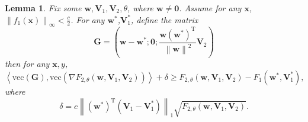 \documentclass{article}
\theoremstyle{plain}
\newtheorem{lem}{Lemma}
\theoremstyle{definition}
\newcommand{\norm}[1]{\left\lVert#1\right\rVert}
\newcommand{\iprod}[2]{\left\langle #1,#2 \right\rangle}
\begin{document}
\begin{lem}
	Fix some $\mathbf{w},\mathbf{V}_1,\mathbf{V}_2,\theta$,
    where $\mathbf{w}\neq\mathbf{0}$.
    Assume for any $\mathbf{x}$, $\norm{f_1(\mathbf{x})}_\infty<\frac c 2$.
    For any $\mathbf{w}^*$,$\mathbf{V}_1^*$, define the matrix
    \[\mathbf{G}=
    \left(\mathbf{w}-\mathbf{w}^*;
    \mathbf{0};
    \frac{\mathbf{w}\left(\mathbf{w}^{*}\right)^\mathrm{T}}{\norm{\mathbf{w}}^2}\mathbf{V}_2\right)\]
	then for any $\mathbf{x},y$,
    \begin{equation}\label{lemma1}
    \iprod{\text{vec}(\mathbf{G})}
    {\text{vec}\left(\nabla F_{2,\theta}(\mathbf{w},\mathbf{V}_1,\mathbf{V}_2)\right)}
    +\delta
    \geq F_{2,\theta}(\mathbf{w},\mathbf{V}_1,\mathbf{V}_2)
    -F_1(\mathbf{w}^*,\mathbf{V}_1^*),
    \end{equation}
    where
    \[\delta=c\norm{\left(\mathbf{w}^*\right)^\mathrm{T}\left(\mathbf{V}_1-\mathbf{V}_1^*\right)}_1
    \sqrt{F_{2,\theta}(\mathbf{w},\mathbf{V}_1,\mathbf{V}_2)}.\]
\end{lem}
\end{document}
